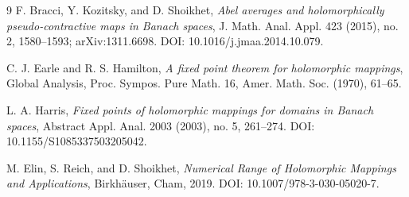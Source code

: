 \documentclass[11pt]{article}
\begin{document}
\begin{thebibliography}{9}
F. Bracci, Y. Kozitsky, and D. Shoikhet,
\emph{Abel averages and holomorphically pseudo-contractive maps in Banach
spaces}, J. Math. Anal. Appl. 423 (2015), no. 2, 1580--1593;
arXiv:1311.6698. DOI: 10.1016/j.jmaa.2014.10.079.

C. J. Earle and R. S. Hamilton,
\emph{A fixed point theorem for holomorphic mappings},
Global Analysis, Proc. Sympos. Pure Math. 16, Amer. Math. Soc. (1970),
61--65.

L. A. Harris,
\emph{Fixed points of holomorphic mappings for domains in Banach spaces},
Abstract Appl. Anal. 2003 (2003), no. 5, 261--274.
DOI: 10.1155/S1085337503205042.

M. Elin, S. Reich, and D. Shoikhet,
\emph{Numerical Range of Holomorphic Mappings and Applications},
Birkh\"auser, Cham, 2019. DOI: 10.1007/978-3-030-05020-7.
\end{thebibliography}
\end{document}
